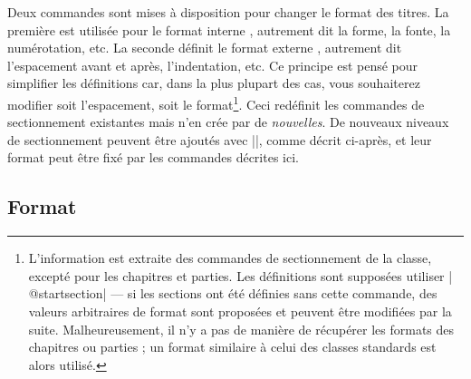 \documentclass[a4paper]{ltxguide}
\def\gobble#1{}
\def\cs#1{\expandafter\gobble\string\\#1}
\begin{document}
Deux commandes sont mises à disposition pour changer le format des titres. La première
est utilisée pour le format \og interne \fg{}, autrement dit la forme, la fonte, 
la numérotation, etc. La seconde définit le format \og externe \fg{}, autrement dit 
l'espacement avant et après, l'indentation, etc. Ce principe est pensé pour simplifier 
les définitions car, dans la plus plupart des cas, vous souhaiterez modifier soit 
l'espacement, soit le format\footnote{L'information est \og extraite \fg{} des 
commandes de sectionnement de la classe, excepté pour les chapitres et parties. Les
définitions sont supposées utiliser |\cs{@startsection}| --- si les sections ont été
définies sans cette commande, des valeurs arbitraires de format sont proposées et 
peuvent être modifiées par la suite. Malheureusement, il n'y a pas de manière de
récupérer les formats des chapitres ou parties ; un format similaire à celui des 
classes standards est alors utilisé.}. Ceci redéfinit les commandes de sectionnement
existantes mais n'en crée par de \emph{nouvelles}. De nouveaux niveaux de 
sectionnement peuvent être ajoutés avec |\titleclass|, comme décrit ci-après, et
leur format peut être fixé par les commandes décrites ici.

\subsection{Format}
\end{document}
